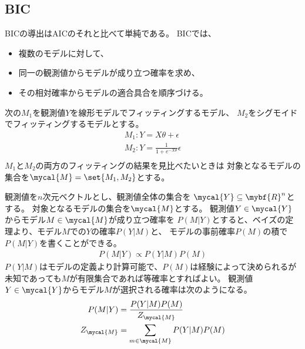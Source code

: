 	\subsection{BIC}\label{s2:BIC} %
		BICの導出はAICのそれと比べて単純である。
		BICでは、
		\begin{itemize}\setlength{\itemsep}{-1mm} %
			\item 複数のモデルに対して、
			\item 同一の観測値からモデルが成り立つ確率を求め、
			\item その相対確率からモデルの適合具合を順序づける。
		\end{itemize} %

		\begin{example}[対象となるモデルの集合]\label{eg:対象となるモデルの集合} %
			次の$M_1$を観測値$Y$を線形モデルでフィッティングするモデル、
			$M_2$をシグモイドでフィッティングするモデルとする。
			\begin{equation*}\begin{split} %
				M_1: Y = X\theta + \epsilon \\
				M_2: Y = \frac{1}{1 + e^{-X\theta}} \epsilon \\
			\end{split}\end{equation*} %
			$M_1$と$M_2$の両方のフィッティングの結果を見比べたいときは
			対象となるモデルの集合を$\mycal{M}=\set{M_1,M_2}$とする。
		\end{example} %

		観測値を$n$次元ベクトルとし、観測値全体の集合を
		$\mycal{Y}\subseteq\mybf{R}^n$とする。
		対象となるモデルの集合を$\mycal{M}$とする。
		観測値$Y\in\mycal{Y}$からモデル$M\in\mycal{M}$が成り立つ確率を
		$P(M|Y)$とすると、ベイズの定理より、モデル$M$での$Y$の確率$P(Y|M)$と、
		モデルの事前確率$P(M)$の積で$P(M|Y)$を書くことができる。
		\begin{equation*}\begin{split} %
			P(M|Y) \propto P(Y|M)P(M)
		\end{split}\end{equation*} %
		$P(Y|M)$はモデルの定義より計算可能で、$P(M)$は経験によって決められるが
		未知であっても$M$が有限集合であれば等確率とすればよい。
		観測値$Y\in\mycal{Y}$からモデル$M$が選択される確率は次のようになる。
		\begin{equation*}\begin{split} %
			P(M|Y) &= \frac{P(Y|M)P(M)}{Z_\mycal{M}} \\
			Z_{\mycal{M}} &= \sum_{m\in\mycal{M}}P(Y|M)P(M) \\
		\end{split}\end{equation*} %

